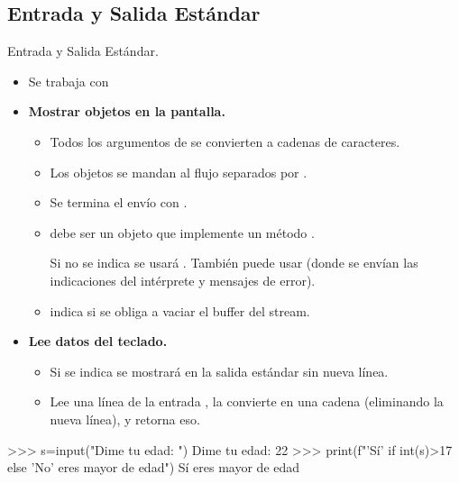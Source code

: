 \documentclass[10pt, envcountsect , spanish]{beamer}
\begin{document}
\subsection{Entrada y Salida Estándar}

\begin{frame}[fragile]{Entrada y Salida Estándar.} 
\begin{itemize}
\item Se trabaja con 

\item \textbf{Mostrar objetos en la pantalla.}\\
{ }



\begin{itemize}
\item Todos los argumentos de  se convierten a cadenas de caracteres.
\item Los objetos se mandan al flujo separados por  .
\item Se termina el envío con  .
\item {} debe ser un objeto que implemente un método .

Si no se indica se usará  .
También puede usar   (donde se envían las indicaciones del intérprete y mensajes de error).

\item {} indica si se obliga a vaciar el buffer del stream.
\end{itemize}


\item \textbf{Lee datos del teclado.}  


\begin{itemize}
\item Si se indica  se mostrará en la salida estándar sin nueva línea.

\item Lee  una línea de la entrada , la convierte en una cadena (eliminando la nueva línea), y retorna eso.
\end{itemize}

\end{itemize}

\begin{pyverbatim}[][frame=single, fontsize=\scriptsize]
>>> s=input("Dime tu edad: ")
Dime tu edad: 22
>>> print(f"{'Sí' if int(s)>17 else 'No'} eres mayor de edad")
Sí eres mayor de edad
\end{pyverbatim}
\end{frame}
\end{document}
